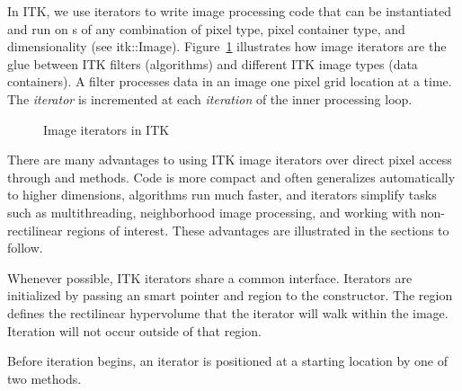 In ITK, we use iterators to write image processing code that can be
instantiated and run on s of any combination of pixel type,
pixel container type, and dimensionality (see itk::Image).
Figure~\ref{fig:ImageIterators} illustrates how image iterators are the glue
between ITK filters (algorithms) and different ITK image types (data
containers). A filter processes data in an image one pixel grid location at a time.  The
\emph{iterator} is incremented at each \emph{iteration} of the inner processing
loop.  


\begin{figure}
\centering
\caption[Image iterators in ITK]{Image iterators in ITK}
\protect\label{fig:ImageIterators}
\end{figure}

There are many advantages to using ITK image iterators over direct pixel access
through  and  methods.  Code is
more compact and often generalizes automatically to higher dimensions,
algorithms run much faster, and iterators simplify tasks such as
multithreading, neighborhood image processing, and working with non-rectilinear
regions of interest.  These advantages are illustrated in the sections to
follow.


Whenever possible, ITK iterators share a common interface.  Iterators are
initialized by passing an  smart pointer and region to the
constructor.  The region defines the rectilinear hypervolume that the iterator
will walk within the image.  Iteration will not occur outside of that region.

Before iteration begins, an iterator is positioned at a starting location by
one of two methods.

